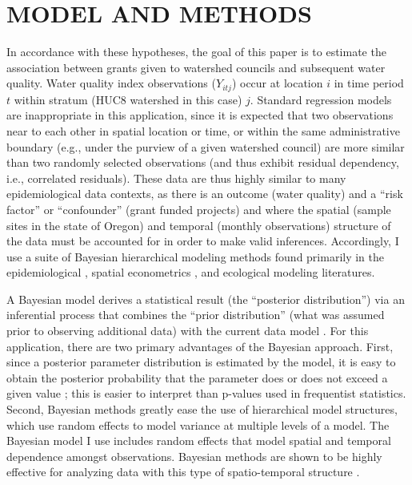 \documentclass[12pt,a4paper,titlepage]{article}
\begin{document}
\section*{\bf\MakeUppercase{Model and Methods}}

In accordance with these hypotheses, the goal of this paper is to estimate the association between grants given to watershed councils and subsequent water quality. Water quality index observations ($Y_{itj}$) occur at location $i$ in time period $t$ within stratum (HUC8 watershed in this case) $j$. Standard regression models are inappropriate in this application, since it is expected that two observations near to each other in spatial location or time, or within the same administrative boundary (e.g., under the purview of a given watershed council) are more similar than two randomly selected observations (and thus exhibit residual dependency, i.e., correlated residuals). These data are thus highly similar to many epidemiological data contexts, as there is an outcome (water quality) and a “risk factor” or “confounder” (grant funded projects) and where the spatial (sample sites in the state of Oregon) and temporal (monthly observations) structure of the data must be accounted for in order to make valid inferences. Accordingly, I use a suite of Bayesian hierarchical modeling methods found primarily in the epidemiological \parencite{cameletti2013,blangiardo2010,blangiardo2013}, spatial econometrics \parencite{bivand2008,bivand2013,gomez-rubio2014}, and ecological modeling \parencite{cosandey-godin2014, clark2005,clark2006,wikle2003,cressie2009,wikle2010,xu2007,cressie2011} literatures.

A Bayesian model derives a statistical result (the “posterior distribution”) via an inferential process that combines the “prior distribution” (what was assumed prior to observing additional data) with the current data model \parencite{bernardo2009}. For this application, there are two primary advantages of the Bayesian approach. First, since a posterior parameter distribution is estimated by the model, it is easy to obtain the posterior probability that the parameter does or does not exceed a given value \parencite{blangiardo2013}; this is easier to interpret than p-values used in frequentist statistics. Second, Bayesian methods greatly ease the use of hierarchical model structures, which use random effects to model variance at multiple levels of a model. The Bayesian model I use includes random effects that model spatial and temporal dependence amongst observations. Bayesian methods are shown to be highly effective for analyzing data with this type of spatio-temporal structure \parencite{dunson2001}.
\end{document}
